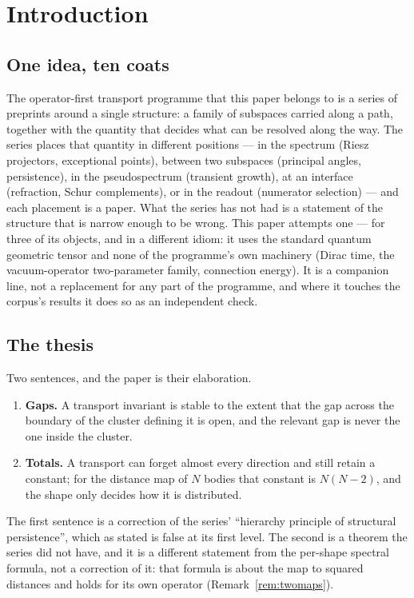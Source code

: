 \section{Introduction}\label{sec:intro}

\subsection{One idea, ten coats}

The operator-first transport programme that this paper belongs to is a series of preprints
\Cc{} around a single structure: a family of subspaces carried along a path, together with the
quantity that decides what can be resolved along the way. The series places that quantity in
different positions --- in the spectrum (Riesz projectors, exceptional points), between two
subspaces (principal angles, persistence), in the pseudospectrum (transient growth), at an
interface (refraction, Schur complements), or in the readout (numerator selection) --- and each
placement is a paper. What the series has not had is a statement of the structure that is
narrow enough to be wrong. This paper attempts one --- for three of its objects, and in a
different idiom: it uses the standard quantum geometric tensor and none of the programme's own
machinery (Dirac time, the vacuum-operator two-parameter family, connection energy). It is a
companion line, not a replacement for any part of the programme, and where it touches the
corpus's results it does so as an independent check.

\subsection{The thesis}

Two sentences, and the paper is their elaboration.

\begin{enumerate}[label=(\roman*)]
\item \textbf{Gaps.} A transport invariant is stable to the extent that the gap across
the boundary of the cluster defining it is open, and the relevant gap is never the one inside
the cluster.
\item \textbf{Totals.} A transport can forget almost every direction and still retain a constant;
for the distance map of $N$ bodies that constant is $N(N-2)$, and the shape only decides how it
is distributed.
\end{enumerate}

The first sentence is a correction of the series' ``hierarchy principle of structural
persistence'', which as stated is false at its first level. The second is a theorem the series
did not have, and it is a different statement from the per-shape spectral formula, not a
correction of it: that formula is about the map to squared distances and holds for its own
operator (Remark~\ref{rem:twomaps}).

